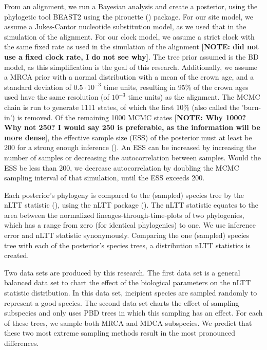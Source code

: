 \documentclass{article}
\begin{document}
From an alignment, we run a Bayesian analysis and create a posterior, 
using the phylogetic tool BEAST2 \cite{beast2} using the 
pirouette (\cite{pirouette}) package. For our site model, we assume a Jukes-Cantor 
nucleotide substitution model, as we used that in the simulation of the alignment.
For our clock model, we assume a strict clock with the same fixed rate as 
used in the simulation of the alignment \textbf{[NOTE: \cite{moller2018} did not use a
fixed clock rate, I do not see why]}. The tree prior assumed is the BD model, 
as this simplification is the goal of this research. 
Additionally, we assume a MRCA prior with a normal distribution
with a mean of the crown age, and a standard deviation of $0.5 \cdot 10^{-3}$ time units,
resulting in 95\% of the crown ages used have the same resolution (of $10^{-3}$ time 
units) as the alignment. The MCMC chain is run to generate 1111 states,
of which the first 10\% (also called the 'burn-in') is removed. Of the remaining
1000 MCMC states \textbf{[NOTE: Why 1000? Why not 250? I would say 250 is preferable, as
the information will be more dense]}, the effective sample size (ESS) of the posterior must at least be 200
for a strong enough inference (\cite{beastbook}). An ESS can be increased by increasing
the number of samples or decreasing the autocorrelation between samples. 
Would the ESS be less than 200, we decrease autocorrelation by doubling 
the MCMC sampling interval of that simulation, until the ESS exceeds 200.

Each posterior's phylogeny is compared to the (sampled) species tree
by the nLTT statistic (\cite{janzen2015}), using the nLTT package (\cite{nltt}). 
The nLTT statistic equates to the area between the normalized
lineages-through-time-plots of two phylogenies, which has a range 
from zero (for identical phylogenies) to one. We use inference error 
and nLTT statistic synonymously. Comparing the one (sampled) species tree
with each of the posterior's species trees, a distribution nLTT statistics
is created. 

Two data sets are produced by this research.
The first data set is a general balanced data set to chart
the effect of the biological parameters on the nLTT statistic
distribution. In this data set, incipient species are sampled 
randomly to represent a good species.
The second data set charts the effect of sampling
subspecies and only uses PBD trees in which this sampling
has an effect. For each of these trees, we sample both MRCA and
MDCA subspecies. We predict that these two most extreme sampling methods
result in the most pronounced differences.
\end{document}
